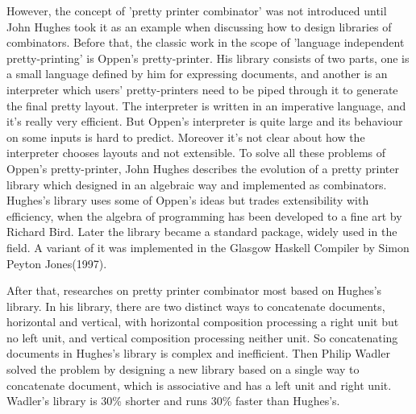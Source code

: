 However, the concept of 'pretty printer combinator' was not introduced until John Hughes took it as an example when discussing how to design libraries of combinators\cite{hughes1995design}. Before that, the classic work in the scope of 'language independent pretty-printing' is Oppen's pretty-printer\cite{oppen1980prettyprinting}. His library consists of two parts, one is a small language defined by him for expressing documents, and another is an interpreter which users' pretty-printers need to be piped through it to generate the final pretty layout. The interpreter is written in an imperative language, and it's really very efficient. But Oppen's interpreter is quite large and its behaviour on some inputs is hard to predict. Moreover it's not clear about how the interpreter chooses layouts and not extensible. To solve all these problems of Oppen's pretty-printer, John Hughes describes the evolution of a pretty printer library which designed in an algebraic way and implemented as combinators. Hughes's library uses some of Oppen's ideas but trades extensibility with efficiency, when the algebra of programming has been developed to a fine art by Richard Bird\cite{bird1996algebra}. Later the library became a standard package, widely used in the field. A variant of it was implemented in the Glasgow Haskell Compiler by Simon Peyton Jones(1997)\cite{wadler2003prettier}.

After that, researches on pretty printer combinator most based on Hughes's library. In his library, there are two distinct ways to concatenate documents, horizontal and vertical, with horizontal composition processing a right unit but no left unit, and vertical composition processing neither unit\cite{wadler2003prettier}. So concatenating documents in Hughes's library is complex and inefficient. Then Philip Wadler solved the problem by designing a new library based on a single way to concatenate document, which is associative and has a left unit and right unit\cite{wadler2003prettier}. Wadler's library is 30\% shorter and runs 30\% faster than Hughes's.





